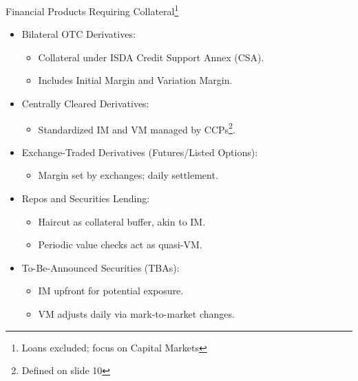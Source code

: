 \documentclass[handout, aspectratio=169]{beamer}
\begin{document}
\begin{frame}{Financial Products Requiring Collateral\footnote{Loans excluded; focus on Capital Markets}}
  \begin{itemize}
    \item Bilateral OTC Derivatives:
    \begin{itemize}
      \item Collateral under ISDA Credit Support Annex (CSA).
      \item Includes Initial Margin and Variation Margin.
    \end{itemize}
    \item Centrally Cleared Derivatives:
    \begin{itemize}
      \item Standardized IM and VM managed by CCPs\footnote{Defined on slide 10}.
    \end{itemize}
    \item Exchange-Traded Derivatives (Futures/Listed Options):
    \begin{itemize}
      \item Margin set by exchanges; daily settlement.
    \end{itemize}
    \item Repos and Securities Lending:
    \begin{itemize}
      \item Haircut as collateral buffer, akin to IM.
      \item Periodic value checks act as quasi-VM.
    \end{itemize}
    \item To-Be-Announced Securities (TBAs):
    \begin{itemize}
      \item IM upfront for potential exposure.
      \item VM adjusts daily via mark-to-market changes.        
    \end{itemize}
  \end{itemize}
\end{frame}
\end{document}
